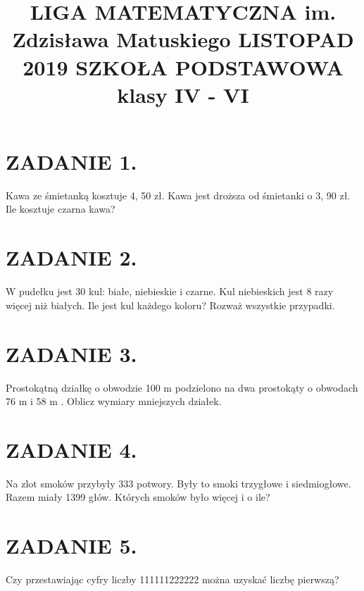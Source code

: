 \documentclass[10pt]{article}
\title{LIGA MATEMATYCZNA im. Zdzisława Matuskiego LISTOPAD 2019 SZKOŁA PODSTAWOWA klasy IV - VI }
\author{}
\date{}
\begin{document}
\maketitle
\section*{ZADANIE 1.}
Kawa ze śmietanką kosztuje 4, 50 zł. Kawa jest droższa od śmietanki o 3, 90 zł. Ile kosztuje czarna kawa?

\section*{ZADANIE 2.}
W pudełku jest 30 kul: białe, niebieskie i czarne. Kul niebieskich jest 8 razy więcej niż białych. Ile jest kul każdego koloru? Rozważ wszystkie przypadki.

\section*{ZADANIE 3.}
Prostokątną działkę o obwodzie 100 m podzielono na dwa prostokąty o obwodach 76 m i 58 m . Oblicz wymiary mniejszych działek.

\section*{ZADANIE 4.}
Na zlot smoków przybyły 333 potwory. Były to smoki trzygłowe i siedmiogłowe. Razem miały 1399 głów. Których smoków było więcej i o ile?

\section*{ZADANIE 5.}
Czy przestawiając cyfry liczby 111111222222 można uzyskać liczbę pierwszą?
\end{document}
